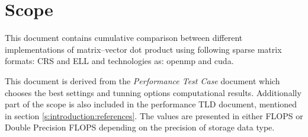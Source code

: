 \section{Scope} \label{s:introduction:scope}
	\begin{comment}
		Identify the test items (software or system) that are the object of testing, e.g., specific attributes of the
		software, the installation instructions, the user instructions, interfacing hardware, database conversion
		software that is not a part of the operational system) including their version/revision level. Also
		identify any procedures for their transfer from other environments to the test environment.
		Supply references to the test item documentation relevant to an individual level of test, if it exists, such
		as follows:
		⎯ Requirements
		⎯ Design
		⎯ User’s guide
		⎯ Operations guide
		⎯ Installation guide
		Reference any Anomaly Reports relating to the test items.
		Identify any items that are to be specifically excluded from testing.
	\end{comment}
	This document contains cumulative comparison between different implementations of matrix--vector dot product using following sparse matrix formats: \gls{CRS} and \gls{ELL} and technologies as: \gls{openmp} and \gls{cuda}.
	
	This document is derived from the \emph{Performance Test Case} document which chooses the best settings and tunning options computational results. Additionally part of the scope is also included in the performance \gls{TLD} document, mentioned in section \ref{s:introduction:references}. The values are presented in either \gls{FLOPS} or Double Precision \gls{FLOPS} depending on the precision of storage data type.
	
	\begin{center}
	\end{center}
